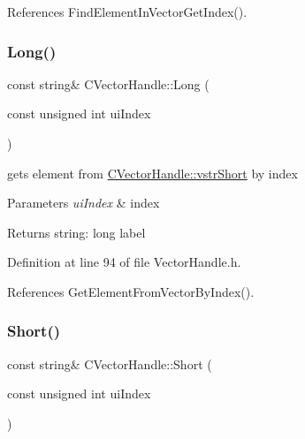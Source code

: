 References Find\+Element\+In\+Vector\+Get\+Index().

\mbox{\label{classCVectorHandle_a392678513c7224a67022720797ac7b1b}} 
\subsubsection{\texorpdfstring{Long()}{Long()}}
{\footnotesize\ttfamily const string\& C\+Vector\+Handle\+::\+Long (\begin{DoxyParamCaption}\item[{const unsigned int}]{ui\+Index }\end{DoxyParamCaption})\hspace{0.3cm}{\ttfamily [inline]}}



gets element from \hyperlink{classCVectorHandle_afb50c8a33d4cf70bf92c644dca409ea2}{C\+Vector\+Handle\+::vstr\+Short} by index 


\begin{DoxyParams}{Parameters}
{\em ui\+Index} & index \\
\hline
\end{DoxyParams}
\begin{DoxyReturn}{Returns}
string\+: long label 
\end{DoxyReturn}


Definition at line 94 of file Vector\+Handle.\+h.



References Get\+Element\+From\+Vector\+By\+Index().

\mbox{\label{classCVectorHandle_ac26fa8d3b66a5cc88dea0b411f5e20de}} 
\subsubsection{\texorpdfstring{Short()}{Short()}}
{\footnotesize\ttfamily const string\& C\+Vector\+Handle\+::\+Short (\begin{DoxyParamCaption}\item[{const unsigned int}]{ui\+Index }\end{DoxyParamCaption})\hspace{0.3cm}{\ttfamily [inline]}}



